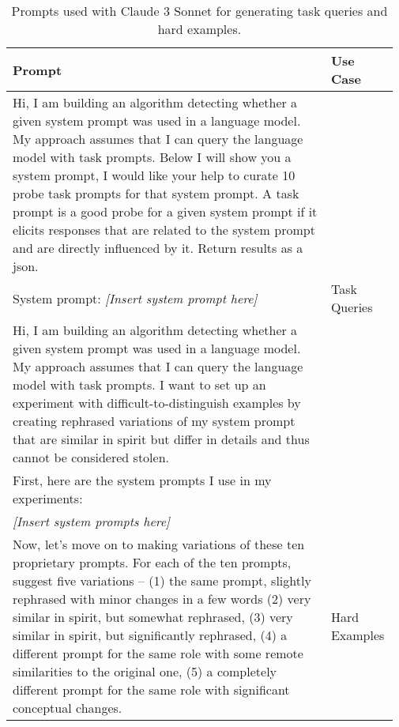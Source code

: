 \begin{table}[!ht]
\caption{Prompts used with Claude 3 Sonnet for generating task queries and hard examples.}
\label{table:task_prompt_generation}
\vskip 0.15in
\begin{center}
\begin{tabular}{p{0.8\linewidth}p{0.17\linewidth}}
\toprule
Prompt & Use Case \\
\midrule
Hi, I am building an algorithm detecting whether a given system prompt was used in a language model. My approach assumes that I can query the language model with task prompts. Below I will show you a system prompt, I would like your help to curate 10 probe task prompts for that system prompt. A task prompt is a good probe for a given system prompt if it elicits responses that are related to the system prompt and are directly influenced by it. Return results as a json. \\
System prompt: \textit{[Insert system prompt here]} & Task Queries \\
\midrule
Hi, I am building an algorithm detecting whether a given system prompt was used in a language model. My approach assumes that I can query the language model with task prompts. I want to set up an experiment with difficult-to-distinguish examples by creating rephrased variations of my system prompt that are similar in spirit but differ in details and thus cannot be considered stolen. \\
First, here are the system prompts I use in my experiments: \\
\textit{[Insert system prompts here]}\\
Now, let's move on to making variations of these ten proprietary prompts. For each of the ten prompts, suggest five variations -- (1) the same prompt, slightly rephrased with minor changes in a few words (2) very similar in spirit, but somewhat rephrased, (3) very similar in spirit, but significantly rephrased, (4) a different prompt for the same role with some remote similarities to the original one, (5) a completely different prompt for the same role with significant conceptual changes. & Hard Examples \\
\bottomrule
\end{tabular}
\end{center}
\vskip -0.1in
\end{table}